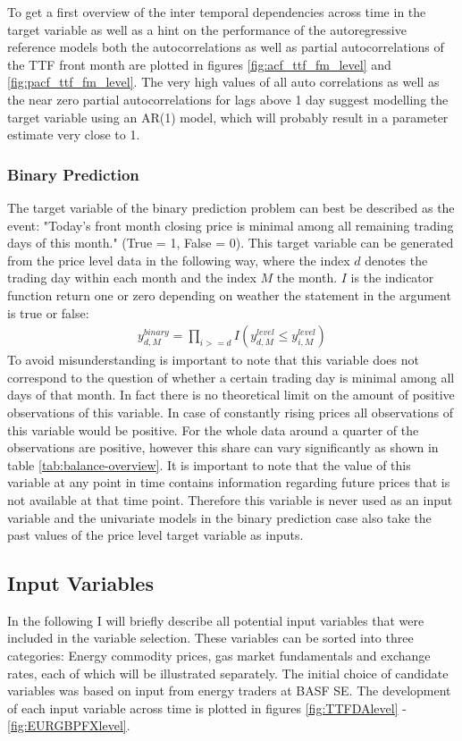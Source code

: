 To get a first overview of the inter temporal dependencies across time in the target variable as well as a hint on the performance of the autoregressive reference models both the autocorrelations  as well as partial autocorrelations of the TTF front month are plotted in figures \ref{fig:acf_ttf_fm_level} and \ref{fig:pacf_ttf_fm_level}. The very high values of all auto correlations as well as the near zero partial autocorrelations for lags above 1 day suggest modelling the target variable using an AR(1) model, which will probably result in a parameter estimate very close to 1. 

\subsubsection{Binary Prediction}
The target variable of the binary prediction problem can best be described as the event: "Today's front month closing price is minimal among all remaining trading days of this month." (True = 1, False = 0). This target variable can be generated from the price level data in the following way, where the index $d$ denotes the trading day within each month and the index $M$ the month. $I$ is the indicator function return one or zero depending on weather the statement in the argument is true or false:
\begin{align*}
y_{d,M}^{binary} = \prod_{i >= d} I(y_{d,M}^{level} \leq y_{i,M}^{level})
\end{align*}
To avoid misunderstanding is important to note that this variable does not correspond to the question of whether a certain trading day is minimal among all days of that month. In fact there is no theoretical limit on the amount of positive observations of this variable. In case of constantly rising prices all observations of this variable would be positive. For the whole data around a quarter of the observations are positive, however this share can vary significantly as shown in table \ref{tab:balance-overview}. It is important to note that the value of this variable at any point in time contains information regarding future prices that is not available at that time point. Therefore this variable is never used as an input variable and the univariate models in the binary prediction case also take the past values of the price level target variable as inputs.

\subsection{Input Variables}\label{Sec:Input}
In the following I will briefly describe all potential input variables that were included in the variable selection. These variables can be sorted into three categories: Energy commodity prices, gas market fundamentals and exchange rates, each of which will be illustrated separately. The initial choice of candidate variables was based on input from energy traders at BASF SE. The development of each input variable across time is plotted in figures  \ref{fig:TTFDAlevel} - \ref{fig:EURGBPFXlevel}.

